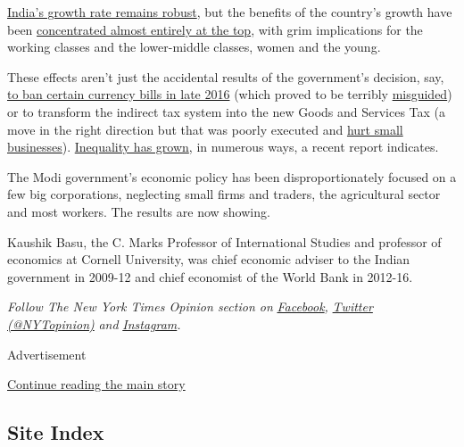 \href{https://economictimes.indiatimes.com/news/economy/indicators/world-bank-forecasts-7-3-per-cent-growth-for-india-making-it-fastest-growing-economy/articleshow/64478238.cms}{India's
growth rate remains robust}, but the benefits of the country's growth
have been
\href{https://www.oxfamindia.org/sites/default/files/himanshu_inequality_Inequality_report_2018.pdf}{concentrated
almost entirely at the top}, with grim implications for the working
classes and the lower-middle classes, women and the young.

These effects aren't just the accidental results of the government's
decision, say,
\href{https://www.nytimes.com/2016/11/27/opinion/in-india-black-money-makes-for-bad-policy.html?_r=0\&module=inline}{to
ban certain currency bills in late 2016} (which proved to be terribly
\href{https://www.nytimes.com/2017/06/29/opinion/india-and-the-visible-hand-of-the-market.html}{misguided})
or to transform the indirect tax system into the new Goods and Services
Tax (a move in the right direction but that was poorly executed and
\href{https://www.hindustantimes.com/business-news/a-year-after-gst-small-businesses-report-huge-drop-in-sales-struggle-with-high-costs-of-compliance/story-2NezKZ0MJ0EOxsocnavDtJ.html}{hurt
small businesses}).
\href{https://www.oxfamindia.org/sites/default/files/himanshu_inequality_Inequality_report_2018.pdf}{Inequality
has grown}, in numerous ways, a recent report indicates.

The Modi government's economic policy has been disproportionately
focused on a few big corporations, neglecting small firms and traders,
the agricultural sector and most workers. The results are now showing.

Kaushik Basu, the C. Marks Professor of International Studies and
professor of economics at Cornell University, was chief economic adviser
to the Indian government in 2009-12 and chief economist of the World
Bank in 2012-16.

\emph{Follow The New York Times Opinion section on}
\href{https://www.facebook.com/nytopinion}{\emph{Facebook}}\emph{,}
\href{http://twitter.com/NYTOpinion}{\emph{Twitter (@NYTopinion)}}
\emph{and}
\href{https://www.instagram.com/nytopinion/}{\emph{Instagram}}\emph{.}

Advertisement

\protect\hyperlink{after-bottom}{Continue reading the main story}

\hypertarget{site-index}{%
\subsection{Site Index}\label{site-index}}

